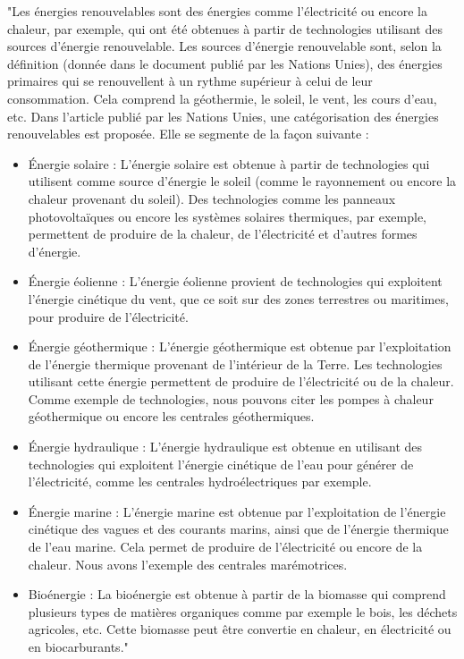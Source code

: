 \documentclass[12pt]{article}
\begin{document}
"Les énergies renouvelables sont des énergies comme l'électricité ou encore 
la chaleur, par exemple, qui ont été obtenues à partir de technologies utilisant 
des sources d'énergie renouvelable. Les sources d'énergie renouvelable sont, 
selon la définition (donnée dans le document \cite{source_enrg} publié par 
les Nations Unies), des énergies primaires qui se renouvellent à un rythme 
supérieur à celui de leur consommation. Cela comprend la géothermie, le soleil, 
le vent, les cours d'eau, etc. Dans l'article \cite{article_UNEP} publié par les 
Nations Unies, une catégorisation des énergies renouvelables est proposée. 
Elle se segmente de la façon suivante : \newline

\begin{itemize}
    \renewcommand{\labelitemi}{-}
\item Énergie solaire :
L'énergie solaire est obtenue à partir de technologies qui 
utilisent comme source d'énergie le soleil (comme le rayonnement ou encore
la chaleur provenant du soleil). Des technologies comme
les panneaux photovoltaïques ou encore les systèmes solaires 
thermiques, par exemple, 
permettent de produire de la chaleur, 
de l'électricité et d'autres formes d'énergie.
\item Énergie éolienne :
L'énergie éolienne provient de technologies qui exploitent l'énergie 
cinétique du vent, que ce soit sur des zones terrestres ou maritimes, 
pour produire de l'électricité. 
\item Énergie géothermique :
L'énergie géothermique est obtenue par l'exploitation de l'énergie thermique 
provenant de l'intérieur de la Terre. Les technologies utilisant
cette énergie permettent de produire de l'électricité ou de la chaleur.
Comme exemple de technologies, nous pouvons citer les pompes à chaleur géothermique ou encore les 
centrales géothermiques.
\item Énergie hydraulique :
L'énergie hydraulique est obtenue en utilisant des technologies qui exploitent l'énergie 
cinétique de l'eau pour générer de l'électricité, comme les centrales hydroélectriques par exemple.
\item Énergie marine :
L'énergie marine est obtenue par l'exploitation de l'énergie cinétique des vagues
 et des courants marins, ainsi que de l'énergie thermique de l'eau marine. 
 Cela permet de produire de l'électricité ou encore de la chaleur. 
 Nous avons l'exemple des centrales marémotrices.
\item Bioénergie :
La bioénergie est obtenue à partir de la biomasse qui comprend plusieurs types 
de matières organiques comme par exemple le bois, les déchets agricoles, etc. 
Cette biomasse peut être convertie en chaleur, en électricité ou en biocarburants."\cite{memoir}
\end{itemize}
\end{document}
